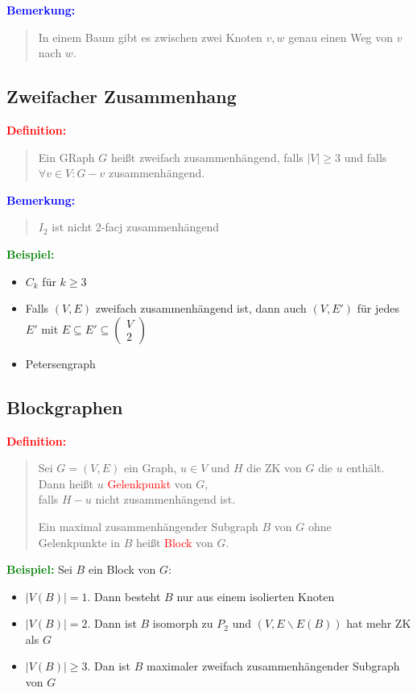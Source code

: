 \documentclass{article}
\newcommand{\red}[1]{\textcolor{red}{#1}}
\newcommand{\blue}[1]{\textcolor{blue}{#1}}
\newcommand{\green}[1]{\textcolor{green}{#1}}
\newcommand{\ex}{\green{\textbf{Beispiel: }}}
\newcommand{\de}[1]{\red{\textbf{Definition: }}\begin{quote}#1\end{quote}}
\newcommand{\an}[1]{\blue{\textbf{Bemerkung: }}\begin{quote}#1\end{quote}}
\newcommand{\vvec}[2]{\begin{pmatrix}#1\\#2\end{pmatrix}}
\newcommand{\bs}{\backslash}
\begin{document}
\an{
    In einem Baum gibt es zwischen zwei Knoten $v,w$ genau einen Weg von $v$ nach $w$.
}

\subsection{Zweifacher Zusammenhang}

\de{
    Ein GRaph $G$ heißt zweifach zusammenhängend, falls $|V| \ge 3$ und falls $\forall v \in V: G-v$ zusammenhängend.
}

\an{
    $I_2$ ist nicht $2$-facj zusammenhängend
}

\ex \begin{itemize}
    \item $C_k$ für $k \ge 3$
    \item Falls $(V,E)$ zweifach zusammenhängend ist, dann auch $(V,E')$ für jedes $E'$ mit $E \subseteq E' \subseteq \vvec{V}{2}$
    \item Petersengraph
\end{itemize}

\subsection{Blockgraphen}

\de{
    Sei $G=(V,E)$ ein Graph, $u \in V$ und $H$ die ZK von $G$ die $u$ enthält.\\
    Dann heißt $u$ \red{Gelenkpunkt} von $G$,\\
    falls $H-u$ nicht zusammenhängend ist.

    Ein maximal zusammenhängender Subgraph $B$ von $G$ ohne\\
    Gelenkpunkte in $B$ heißt \red{Block} von $G$.
}

\ex Sei $B$ ein Block von $G$:
\begin{itemize}
    \item $|V(B)| = 1$. Dann besteht $B$ nur aus einem isolierten Knoten
    \item $|V(B)| = 2$. Dann ist $B$ isomorph zu $P_2$ und $(V, E \bs E(B))$ hat mehr ZK als $G$
    \item $|V(B)| \ge 3$. Dan ist $B$ maximaler zweifach zusammenhängender Subgraph von $G$
\end{itemize}
\end{document}

